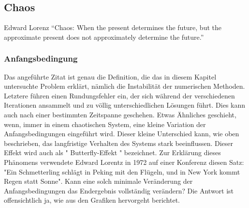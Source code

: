 \subsection{Chaos}
\label{vanderpol:subsection:chaos}
 
\begin{cquote}[30pt]{Edward Lorenz}
``Chaos: When the present determines the future, but the approximate present does not approximately determine the future.''
\end{cquote}
 
\subsubsection{Anfangsbedingung}
\label{vanderpol:subsubsection:anfangsbedingung}
 
Das angeführte Zitat ist genau die Definition, die das in diesem Kapitel untersuchte Problem erklärt, nämlich die Instabilität der numerischen Methoden. Letztere führen einen Rundungsfehler ein, der sich während der verschiedenen Iterationen ansammelt und zu völlig unterschiedlichen Lösungen führt. Dies kann auch nach einer bestimmten Zeitspanne geschehen.
Etwas Ähnliches geschieht, wenn, immer in einem chaotischen System, eine kleine Variation der Anfangsbedingungen eingeführt wird.  Dieser kleine Unterschied kann, wie oben beschrieben, das langfristige Verhalten des Systems stark beeinflussen. Dieser Effekt wird auch als " Butterfly-Effekt " bezeichnet. Zur Erklärung dieses Phänomens verwendete Edward Lorentz in 1972 auf einer Konferenz diesen Satz: "Ein Schmetterling schlägt in Peking mit den Flügeln, und in New York kommt Regen statt Sonne". Kann eine solch minimale Veränderung der Anfangsbedingungen das Endergebnis vollständig verändern? Die Antwort ist offensichtlich ja, wie aus den Grafiken hervorgeht berichtet.





